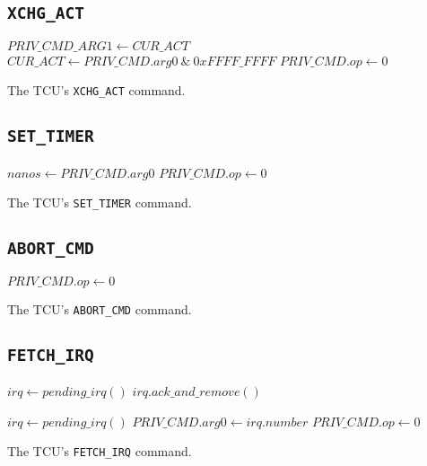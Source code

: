 \subsection{\texttt{XCHG\_ACT}}

\begin{algorithm}[H]
    $PRIV\_CMD\_ARG1 \gets CUR\_ACT$\;
    $CUR\_ACT \gets PRIV\_CMD.arg0\ \&\ 0xFFFF\_FFFF$\;
    \BlankLine
    $PRIV\_CMD.op \gets 0$\;
    \caption{The TCU's \texttt{XCHG\_ACT} command.}
\end{algorithm}

\subsection{\texttt{SET\_TIMER}}

\begin{algorithm}[H]
    $nanos \gets PRIV\_CMD.arg0$\;
    \BlankLine
    $PRIV\_CMD.op \gets 0$\;
    \caption{The TCU's \texttt{SET\_TIMER} command.}
\end{algorithm}

\subsection{\texttt{ABORT\_CMD}}

\begin{algorithm}[H]
    \BlankLine
    $PRIV\_CMD.op \gets 0$\;
    \caption{The TCU's \texttt{ABORT\_CMD} command.}
\end{algorithm}

\subsection{\texttt{FETCH\_IRQ}}

\begin{algorithm}[H]
    $irq \gets pending\_irq()$\;
    \BlankLine
    $irq.ack\_and\_remove()$\;

    $irq \gets pending\_irq()$\;
    \BlankLine
    $PRIV\_CMD.arg0 \gets irq.number$\;
    $PRIV\_CMD.op \gets 0$\;
    \caption{The TCU's \texttt{FETCH\_IRQ} command.}
\end{algorithm}

